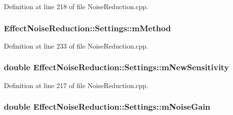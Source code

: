 Definition at line 218 of file Noise\+Reduction.\+cpp.

\subsubsection[{\texorpdfstring{m\+Method}{mMethod}}]{ Effect\+Noise\+Reduction\+::\+Settings\+::m\+Method}\hypertarget{class_effect_noise_reduction_1_1_settings_a673a66bef76870471ba358010c720ddb}{}\label{class_effect_noise_reduction_1_1_settings_a673a66bef76870471ba358010c720ddb}


Definition at line 233 of file Noise\+Reduction.\+cpp.

\subsubsection[{\texorpdfstring{m\+New\+Sensitivity}{mNewSensitivity}}]{\setlength{\rightskip}{0pt plus 5cm}double Effect\+Noise\+Reduction\+::\+Settings\+::m\+New\+Sensitivity}\hypertarget{class_effect_noise_reduction_1_1_settings_a8678912f0a5fe978e3a4809ec405633d}{}\label{class_effect_noise_reduction_1_1_settings_a8678912f0a5fe978e3a4809ec405633d}


Definition at line 217 of file Noise\+Reduction.\+cpp.

\subsubsection[{\texorpdfstring{m\+Noise\+Gain}{mNoiseGain}}]{\setlength{\rightskip}{0pt plus 5cm}double Effect\+Noise\+Reduction\+::\+Settings\+::m\+Noise\+Gain}\hypertarget{class_effect_noise_reduction_1_1_settings_ac11f719d012357a416d91f761f63f789}{}\label{class_effect_noise_reduction_1_1_settings_ac11f719d012357a416d91f761f63f789}


